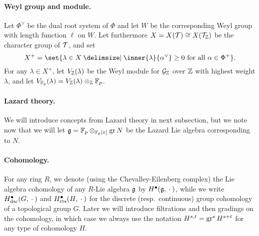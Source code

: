 \paragraph{Weyl group and module.} Let $\Phi^{\vee}$ be the dual root system of $\Phi$ and let $W$ be the corresponding Weyl group with length function $\ell$ on $W$. Let furthermore $X = X(\mathcal{T}) \cong X(\mathcal{T}_{\mathbb{Z}})$ be the character group of $\mathcal{T}$, and set
\begin{equation*}
  X^{+} = \set{\lambda \in X \given \inner{\lambda}{\alpha^\vee} \geq 0 \text{ for all } \alpha \in \Phi^+}.
\end{equation*}%
%
For any $\lambda \in X^+$, let $V_{\mathbb{Z}}(\lambda)$ be the Weyl module for $\mathcal{G}_{\mathbb{Z}}$ over $\mathbb{Z}$ with highest weight $\lambda$, and let $V_{\mathbb{F}_{p}}(\lambda) = V_{\mathbb{Z}}(\lambda) \otimes_{\mathbb{Z}} \mathbb{F}_{p}$.

\paragraph{Lazard theory.} We will introduce concepts from Lazard theory in next subsection, but we note now that we will let $\mathfrak{g} = \mathbb{F}_p \otimes_{\mathbb{F}_p[\pi]} \operatorname{gr} N$ be the Lazard Lie algebra corresponding to $N$.

\paragraph{Cohomology.} For any ring $R$, we denote (using the Chevalley-Eilenberg complex) the Lie algebra cohomology of any $R$-Lie algebra $\mathfrak{g}$ by $H^{\bullet}(\mathfrak{g}, \:\cdot\:)$, while we write $H_{\mathrm{dsc}}^{\bullet}(G, \:\cdot\:)$ and $H_{\mathrm{cts}}^{\bullet}(H, \:\cdot\:)$ for the discrete (resp.\ continuous) group cohomology of a topological group $G$. Later we will introduce filtrations and then gradings on the cohomology, in which case we always use the notation $H^{s,t} = \operatorname{gr}^{s}H^{s+t}$ for any type of cohomology $H$.

